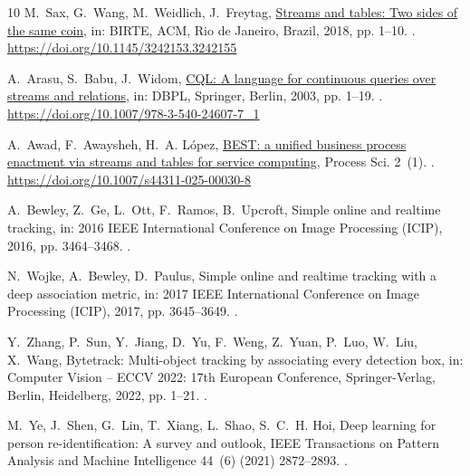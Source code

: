 \documentclass[5p,times]{elsarticle}
\begin{document}
\begin{thebibliography}{10}
M.~Sax, G.~Wang, M.~Weidlich, J.~Freytag, \href{https://doi.org/10.1145/3242153.3242155}{Streams and tables: Two sides of the same coin}, in: {BIRTE}, {ACM}, Rio de Janeiro, Brazil, 2018, pp. 1--10.
\newblock \href {http://dx.doi.org/10.1145/3242153.3242155} {}.
\newline\urlprefix\url{https://doi.org/10.1145/3242153.3242155}

A.~Arasu, S.~Babu, J.~Widom, \href{https://doi.org/10.1007/978-3-540-24607-7\_1}{{CQL:} {A} language for continuous queries over streams and relations}, in: {DBPL}, Springer, Berlin, 2003, pp. 1--19.
\newblock \href {http://dx.doi.org/10.1007/978-3-540-24607-7\_1} {}.
\newline\urlprefix\url{https://doi.org/10.1007/978-3-540-24607-7\_1}

A.~Awad, F.~Awaysheh, H.~A. L{\'{o}}pez, \href{https://doi.org/10.1007/s44311-025-00030-8}{{BEST:} a unified business process enactment via streams and tables for service computing}, Process Sci. 2~(1).
\newblock \href {http://dx.doi.org/10.1007/S44311-025-00030-8} {}.
\newline\urlprefix\url{https://doi.org/10.1007/s44311-025-00030-8}

A.~Bewley, Z.~Ge, L.~Ott, F.~Ramos, B.~Upcroft, Simple online and realtime tracking, in: 2016 IEEE International Conference on Image Processing (ICIP), 2016, pp. 3464--3468.
\newblock \href {http://dx.doi.org/10.1109/ICIP.2016.7533003} {}.

N.~Wojke, A.~Bewley, D.~Paulus, Simple online and realtime tracking with a deep association metric, in: 2017 IEEE International Conference on Image Processing (ICIP), 2017, pp. 3645--3649.
\newblock \href {http://dx.doi.org/10.1109/ICIP.2017.8296962} {}.

Y.~Zhang, P.~Sun, Y.~Jiang, D.~Yu, F.~Weng, Z.~Yuan, P.~Luo, W.~Liu, X.~Wang, Bytetrack: Multi-object tracking by associating every detection box, in: Computer Vision -- ECCV 2022: 17th European Conference, Springer-Verlag, Berlin, Heidelberg, 2022, pp. 1--21.
\newblock \href {http://dx.doi.org/10.1007/978-3-031-20047-2_1} {}.

M.~Ye, J.~Shen, G.~Lin, T.~Xiang, L.~Shao, S.~C.~H. Hoi, Deep learning for person re-identification: A survey and outlook, IEEE Transactions on Pattern Analysis and Machine Intelligence 44~(6) (2021) 2872--2893.
\newblock \href {http://dx.doi.org/10.1109/TPAMI.2021.3054775} {}.


\end{thebibliography}
\end{document}
